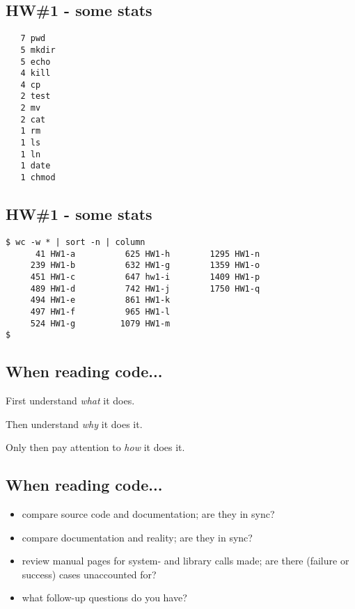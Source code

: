 \documentclass[xga]{xdvislides}
\begin{document}
\subsection{HW\#1 - some stats}
\begin{verbatim}
   7 pwd
   5 mkdir
   5 echo
   4 kill
   4 cp
   2 test
   2 mv
   2 cat
   1 rm
   1 ls
   1 ln
   1 date
   1 chmod
\end{verbatim}

\subsection{HW\#1 - some stats}

\begin{verbatim}
$ wc -w * | sort -n | column
      41 HW1-a          625 HW1-h        1295 HW1-n
     239 HW1-b          632 HW1-g        1359 HW1-o
     451 HW1-c          647 hw1-i        1409 HW1-p
     489 HW1-d          742 HW1-j        1750 HW1-q
     494 HW1-e          861 HW1-k
     497 HW1-f          965 HW1-l
     524 HW1-g         1079 HW1-m
$
\end{verbatim}


\subsection{When reading code...}

\vspace*{\fill}
\begin{center}
\Huge
First understand {\em what} it does. \\
\vspace{.5in}

Then understand {\em why} it does it. \\
\vspace{.5in}

Only then pay attention to {\em how} it does it.
\Normalsize
\end{center}
\vspace*{\fill}

\subsection{When reading code...}
\begin{itemize}
	\item compare source code and documentation; are they in sync?
	\item compare documentation and reality; are they in sync?
	\item review manual pages for system- and library calls made; are
		there (failure or success) cases unaccounted for?
	\item what follow-up questions do you have?
\end{itemize}
\end{document}
